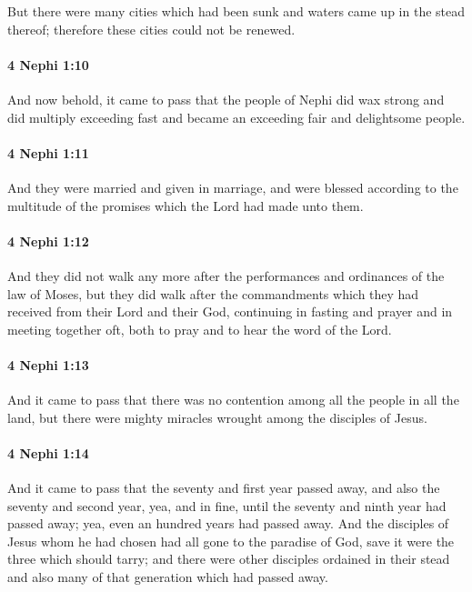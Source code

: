 			But there were many cities which had been sunk
			and waters came up in the stead thereof;
			therefore these cities could not be renewed.

		\paragraph{4 Nephi 1:10} %
			\label{4NEPHI-1-10}

			And now behold, it came to pass that
			the people of Nephi did wax strong and did multiply exceeding fast
			and became an exceeding fair and delightsome people.

		\paragraph{4 Nephi 1:11} %
			\label{4NEPHI-1-11}

			And they were married and given in marriage,
			and were blessed according to the multitude of the promises
			which the Lord had made unto them.

		\paragraph{4 Nephi 1:12} %
			\label{4NEPHI-1-12}

			And they did not walk any more
			after the performances and ordinances of the law of Moses,
			but they did walk after the commandments
			which they had received from their Lord and their God,
			continuing in fasting and prayer and in meeting together oft,
			both to pray and to hear the word of the Lord.

		\paragraph{4 Nephi 1:13} %
			\label{4NEPHI-1-13}

			And it came to pass that there was no contention
			among all the people in all the land,
			but there were mighty miracles wrought among the disciples of Jesus.

		\paragraph{4 Nephi 1:14} %
			\label{4NEPHI-1-14}

			And it came to pass that the seventy and first year passed away,
			and also the seventy and second year,
			yea, and in fine, until the seventy and ninth year had passed away;
			yea, even an hundred years had passed away.
			And the disciples of Jesus whom he had chosen
			had all gone to the paradise of God,
			save it were the three which should tarry;
			and there were other disciples ordained in their stead
			and also many of that generation which had passed away.

